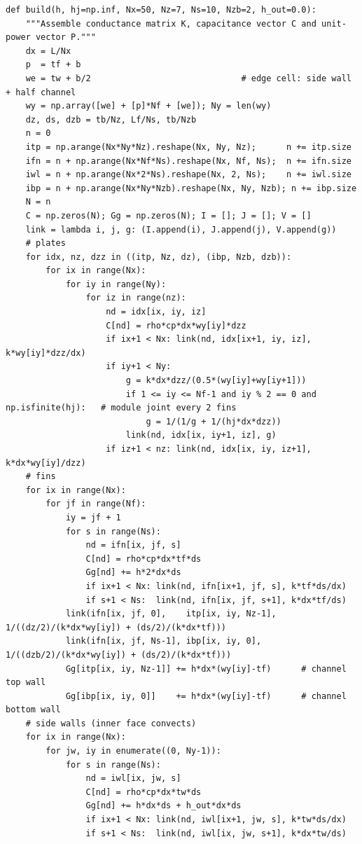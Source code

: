 \documentclass[11pt,a4paper]{article}
\begin{document}
\begin{lstlisting}
def build(h, hj=np.inf, Nx=50, Nz=7, Ns=10, Nzb=2, h_out=0.0):
    """Assemble conductance matrix K, capacitance vector C and unit-power vector P."""
    dx = L/Nx
    p  = tf + b
    we = tw + b/2                              # edge cell: side wall + half channel
    wy = np.array([we] + [p]*Nf + [we]); Ny = len(wy)
    dz, ds, dzb = tb/Nz, Lf/Ns, tb/Nzb
    n = 0
    itp = np.arange(Nx*Ny*Nz).reshape(Nx, Ny, Nz);      n += itp.size
    ifn = n + np.arange(Nx*Nf*Ns).reshape(Nx, Nf, Ns);  n += ifn.size
    iwl = n + np.arange(Nx*2*Ns).reshape(Nx, 2, Ns);    n += iwl.size
    ibp = n + np.arange(Nx*Ny*Nzb).reshape(Nx, Ny, Nzb); n += ibp.size
    N = n
    C = np.zeros(N); Gg = np.zeros(N); I = []; J = []; V = []
    link = lambda i, j, g: (I.append(i), J.append(j), V.append(g))
    # plates
    for idx, nz, dzz in ((itp, Nz, dz), (ibp, Nzb, dzb)):
        for ix in range(Nx):
            for iy in range(Ny):
                for iz in range(nz):
                    nd = idx[ix, iy, iz]
                    C[nd] = rho*cp*dx*wy[iy]*dzz
                    if ix+1 < Nx: link(nd, idx[ix+1, iy, iz], k*wy[iy]*dzz/dx)
                    if iy+1 < Ny:
                        g = k*dx*dzz/(0.5*(wy[iy]+wy[iy+1]))
                        if 1 <= iy <= Nf-1 and iy % 2 == 0 and np.isfinite(hj):   # module joint every 2 fins
                            g = 1/(1/g + 1/(hj*dx*dzz))
                        link(nd, idx[ix, iy+1, iz], g)
                    if iz+1 < nz: link(nd, idx[ix, iy, iz+1], k*dx*wy[iy]/dzz)
    # fins
    for ix in range(Nx):
        for jf in range(Nf):
            iy = jf + 1
            for s in range(Ns):
                nd = ifn[ix, jf, s]
                C[nd] = rho*cp*dx*tf*ds
                Gg[nd] += h*2*dx*ds
                if ix+1 < Nx: link(nd, ifn[ix+1, jf, s], k*tf*ds/dx)
                if s+1 < Ns:  link(nd, ifn[ix, jf, s+1], k*dx*tf/ds)
            link(ifn[ix, jf, 0],    itp[ix, iy, Nz-1], 1/((dz/2)/(k*dx*wy[iy]) + (ds/2)/(k*dx*tf)))
            link(ifn[ix, jf, Ns-1], ibp[ix, iy, 0],    1/((dzb/2)/(k*dx*wy[iy]) + (ds/2)/(k*dx*tf)))
            Gg[itp[ix, iy, Nz-1]] += h*dx*(wy[iy]-tf)      # channel top wall
            Gg[ibp[ix, iy, 0]]    += h*dx*(wy[iy]-tf)      # channel bottom wall
    # side walls (inner face convects)
    for ix in range(Nx):
        for jw, iy in enumerate((0, Ny-1)):
            for s in range(Ns):
                nd = iwl[ix, jw, s]
                C[nd] = rho*cp*dx*tw*ds
                Gg[nd] += h*dx*ds + h_out*dx*ds
                if ix+1 < Nx: link(nd, iwl[ix+1, jw, s], k*tw*ds/dx)
                if s+1 < Ns:  link(nd, iwl[ix, jw, s+1], k*dx*tw/ds)

\end{lstlisting}
\end{document}
